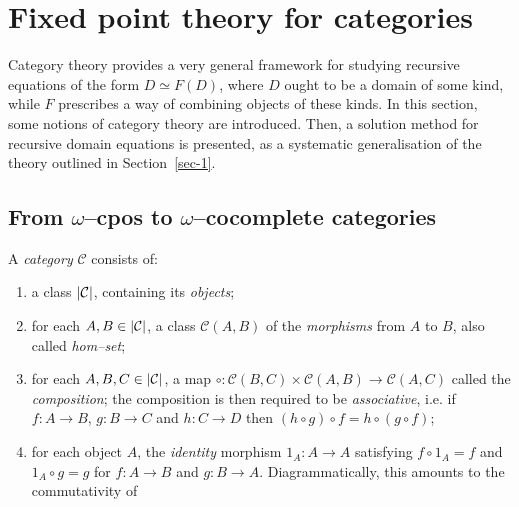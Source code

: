 \section{Fixed point theory for categories}\label{sec-2}

Category theory provides a very general framework for studying
recursive equations of the form \(D \simeq F(D)\), where \(D\) ought to be a domain of some kind, while \(F\) prescribes a way of
combining objects of these kinds.
In this section, some notions of category theory are introduced.
Then, a solution method for recursive domain equations is presented, as a
systematic generalisation of the theory outlined in Section~\ref{sec-1}.

\subsection{From \(\omega\)--cpos to \(\omega\)--cocomplete categories}%

\begin{dfn}
  A \emph{category} \(\mathcal{C}\) consists of:
  \begin{enumerate}
    \item a class \(\lvert \mathcal{C} \rvert\), containing its \emph{objects};
    \item for each \(A, B \in \lvert \mathcal{C} \rvert\),
    a class \(\mathcal{C}(A,B)\) of the \emph{morphisms} from \(A\) to \(B\), also called \emph{hom--set}; %
    \item for each \(A,B,C \in \lvert \mathcal{C} \rvert\), a map
    \(
      \circ \colon \mathcal{C}(B,C) \times \mathcal{C}(A,B) \to \mathcal{C}(A,C)
    \)
    called the \emph{composition};
    the composition is then required to be \emph{associative}, i.e. if \(f \colon A \to B\), \(g \colon B \to C\) and \(h \colon C \to D\) then \((h \circ g) \circ f = h \circ (g \circ f)\);
    \item for each object \(A\), the \emph{identity} morphism \(1_A \colon A \to A\) satisfying \(f \circ 1_A = f\) and \(1_A \circ g = g\) for \(f \colon A \to B\) and \(g \colon B \to A\).
    Diagrammatically, this amounts to the commutativity of
    \begin{center}
    \end{center}
  \end{enumerate}
\end{dfn}

